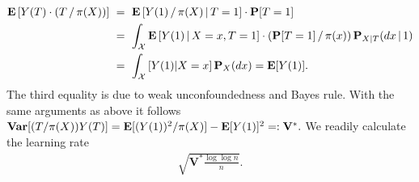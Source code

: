 \begin{align}
  \begin{split}
  \E
  \left[ 
    Y(T)
    \cdot
    (T\,/\,\pi(X))
  \right]
  &\ =\ 
  \E
  \left[ 
    Y(1)
    \,
    /
    \,
    \pi(X)
    \,
    \vert
    \,
    T=1
  \right]
  \cdot
  \P[T=1]
  \\
  &\ =\ 
  \int_\mathcal{X}
  \E
  \left[ 
    Y(1)
    \,
    \vert
    \,
    X=x
    ,
    T=1
  \right]
  \cdot
  (
  \P[T=1]
  \,
  /
  \,
  \pi(x)
  )
  \,
  \P_{X|T}(dx\,|\,1)
  \\
  &\ =\ 
  \int_\mathcal{X}
  \left[ 
    Y(1)
    \vert
    X=x
  \right]
  \P_X(dx)
  =
  \E[Y(1)]
  .
\end{split}
\end{align}
The third equality is due to weak unconfoundedness and Bayes rule.
With the same arguments as above it follows
$
  \mathbf{Var}
  [
    (T/\pi(X))
    Y(T)
  ]
    =
    \mathbf{E}[
    (Y(1))^2
    /
    \pi(X)
    ]
    -
    \mathbf{E}[Y(1)]^2
    =:
    \mathbf{V}^*
    .
$
We readily calculate the learning rate 
\begin{gather}
  \sqrt{
    \mathbf{V}^*
    \frac{\log\log n}{n}
  }
  .
\end{gather}

